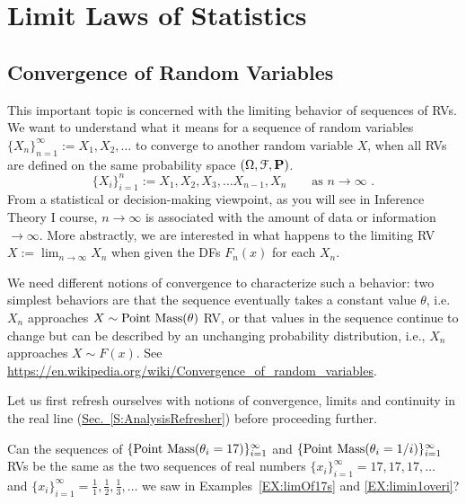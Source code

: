 

\chapter{Limit Laws of Statistics}\label{S:LimitLawsStats}

\section{Convergence of Random Variables}\label{S:ConvOfRVs}

This important topic is concerned with the limiting behavior of sequences of RVs. 
We want to understand what it means for a sequence of random variables $\{X_n\}_{n=1}^{\infty} := X_1,X_2,\ldots$ to converge to another random variable $X$, when all RVs are defined on the same probability space $(\Omega,\mathcal{F},\mathbf{P})$.
\[
\{X_i \}_{i=1}^n := X_1,X_2,X_3, \ldots X_{n-1}, X_n \qquad \text{as  $n \rightarrow \infty$ .}
\]
From a statistical or decision-making viewpoint, as you will see in Inference Theory I course, $n \rightarrow \infty$ is associated with the amount of data or information $\rightarrow \infty$.  
More abstractly, we are interested in what happens to the limiting RV $X := \lim_{n\to \infty} X_n$ when given the DFs $F_n(x)$ for each $X_n$. 

We need different notions of convergence to characterize such a behavior: two simplest behaviors are that the sequence eventually takes a constant value $\theta$, 
i.e. $X_n$ approaches $X \sim \mbox{{\rm Point~Mass}}(\theta)$ RV, or that values in the sequence continue to change but can be described by an unchanging probability distribution, i.e., $X_n$ approaches $X \sim F(x)$. See \url{https://en.wikipedia.org/wiki/Convergence_of_random_variables}.

Let us first refresh ourselves with notions of convergence, limits and continuity in the real line (\hyperref[S:AnalysisRefresher]{Sec.~\ref*{S:AnalysisRefresher}}) before proceeding further.

Can the sequences of $\{\mbox{{\rm Point~Mass}}(\theta_i=17)\}_{i=1}^{\infty}$ and $\{\mbox{{\rm Point~Mass}}(\theta_i=1/i)\}_{i=1}^{\infty}$ RVs be the same as the two sequences of real numbers $\{ x_i \}_{i=1}^{\infty} = 17, 17, 17, \ldots$ and $\{ x_i \}_{i=1}^{\infty} = \frac{1}{1},\frac{1}{2},\frac{1}{3}, \ldots$ we saw in Examples~\ref{EX:limOf17s} and \ref{EX:limin1overi}?


